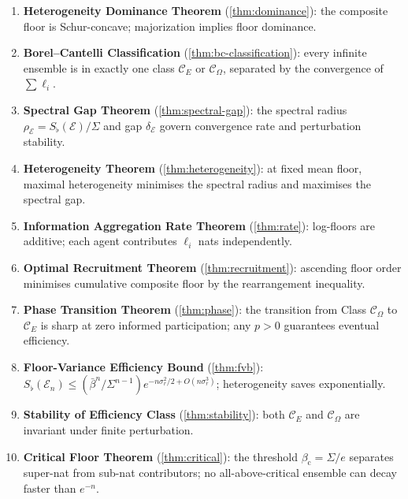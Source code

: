 \documentclass[twocolumn,11pt,a4paper]{article}
\theoremstyle{remark}
\newcommand{\Sflat}{S_{\flat}}
\newcommand{\Ens}{\mathcal{E}}
\newcommand{\srad}{\rho}                  %
\newcommand{\sgap}{\delta}                %
\newcommand{\ClassE}{\mathcal{C}_E}       %
\newcommand{\ClassO}{\mathcal{C}_\Omega}  %
\newcommand{\logfl}{\ell}                 %
\newcommand{\CV}{\sigma_r}               %
\newcommand{\Crit}{\beta_{\mathrm{c}}}   %
\begin{document}
\begin{enumerate}[leftmargin=*, label=\textbf{(\roman*)}]
\item \textbf{Heterogeneity Dominance Theorem}
  (\cref{thm:dominance}): the composite floor is Schur-concave; majorization
  implies floor dominance.

\item \textbf{Borel--Cantelli Classification}
  (\cref{thm:bc-classification}): every infinite ensemble is in exactly one
  class $\ClassE$ or $\ClassO$, separated by the convergence of $\sum \logfl_i$.

\item \textbf{Spectral Gap Theorem}
  (\cref{thm:spectral-gap}): the spectral radius $\srad_\Ens = \Sflat(\Ens)/\Sigma$
  and gap $\sgap_\Ens$ govern convergence rate and perturbation stability.

\item \textbf{Heterogeneity Theorem}
  (\cref{thm:heterogeneity}): at fixed mean floor, maximal heterogeneity
  minimises the spectral radius and maximises the spectral gap.

\item \textbf{Information Aggregation Rate Theorem}
  (\cref{thm:rate}): log-floors are additive; each agent contributes
  $\logfl_i$ nats independently.

\item \textbf{Optimal Recruitment Theorem}
  (\cref{thm:recruitment}): ascending floor order minimises cumulative
  composite floor by the rearrangement inequality.

\item \textbf{Phase Transition Theorem}
  (\cref{thm:phase}): the transition from Class $\ClassO$ to $\ClassE$ is
  sharp at zero informed participation; any $p > 0$ guarantees eventual
  efficiency.

\item \textbf{Floor-Variance Efficiency Bound}
  (\cref{thm:fvb}): $\Sflat(\Ens_n) \le (\bar\beta^n/\Sigma^{n-1})
  e^{-n\CV^2/2 + O(n\CV^3)}$; heterogeneity saves exponentially.

\item \textbf{Stability of Efficiency Class}
  (\cref{thm:stability}): both $\ClassE$ and $\ClassO$ are invariant under
  finite perturbation.

\item \textbf{Critical Floor Theorem}
  (\cref{thm:critical}): the threshold $\Crit = \Sigma/e$ separates
  super-nat from sub-nat contributors; no all-above-critical ensemble can
  decay faster than $e^{-n}$.
\end{enumerate}
\end{document}
